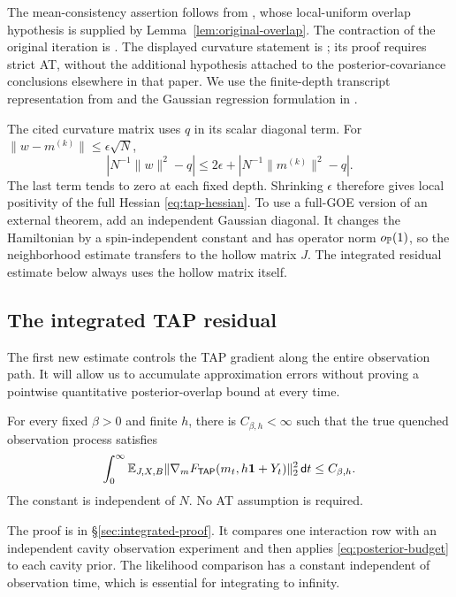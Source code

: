 \documentclass[11pt,reqno]{amsart}
\def\de{{\mathsf{d}}}
\def\tap{{\mathsf{TAP}}}
\begin{document}
The mean-consistency assertion follows from \cite[Theorem~3]{chen2021convergence}, whose local-uniform overlap hypothesis is supplied by Lemma~\ref{lem:original-overlap}. The contraction of the original iteration is \cite[Theorem~2.1]{bolthausen2014iterative}. The displayed curvature statement is \cite[Proposition~4.5 and Remark~4.5]{brennecke2023operator}; its proof requires strict AT, without the additional hypothesis attached to the posterior-covariance conclusions elsewhere in that paper. We use the finite-depth transcript representation from \cite[Section~4]{brennecke2023operator} and the Gaussian regression formulation in \cite[Appendix~A.1]{celentano2024sudakov}.

The cited curvature matrix uses $q$ in its scalar diagonal term. For $\|w-m^{(k)}\|\le\epsilon\sqrt N$,
\[
 \left|N^{-1}\|w\|^2-q\right|
 \le2\epsilon+\left|N^{-1}\|m^{(k)}\|^2-q\right|.
\]
The last term tends to zero at each fixed depth. Shrinking $\epsilon$ therefore gives local positivity of the full Hessian \eqref{eq:tap-hessian}. To use a full-GOE version of an external theorem, add an independent Gaussian diagonal. It changes the Hamiltonian by a spin-independent constant and has operator norm $o_{{\mathbb{P}}}(1)$, so the neighborhood estimate transfers to the hollow matrix $J$. The integrated residual estimate below always uses the hollow matrix itself.

\subsection{The integrated TAP residual}\label{sec:residual}

The first new estimate controls the TAP gradient along the entire observation path. It will allow us to accumulate approximation errors without proving a pointwise quantitative posterior-overlap bound at every time.

\begin{thm}\label{thm:integrated-tap}
For every fixed $\beta>0$ and finite $h$, there is $C_{\beta,h}<\infty$
such that the true quenched observation process satisfies
\begin{equation}\label{eq:integrated-tap}
 \int_0^\infty\bbE_{J,X,B}
 \|\nabla_m F_{\tap}(m_t,h\bone+Y_t)\|_2^2\,\de t
 \le C_{\beta,h}.
\end{equation}
The constant is independent of $N$. No AT assumption is required.
\end{thm}

The proof is in \S\ref{sec:integrated-proof}. It compares one interaction row with an independent cavity observation experiment and then applies \eqref{eq:posterior-budget} to each cavity prior. The likelihood comparison has a constant independent of observation time, which is essential for integrating to infinity.
\end{document}
